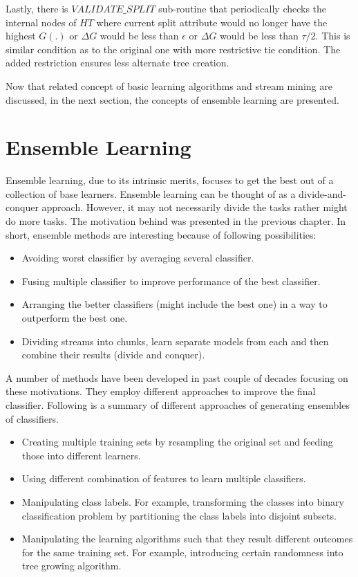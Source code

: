 Lastly, there is $VALIDATE\_SPLIT$ sub-routine that periodically checks the internal nodes of $HT$ where current split attribute would no longer have the highest $G(.)$ or $\Delta G$ would be less than $\epsilon$ or $\Delta G$ would be less than $\tau/2$. This is similar condition as to the original one with more restrictive tie condition. The added restriction ensures less alternate tree creation.

Now that related concept of basic learning algorithms and stream mining are discussed, in the next section, the concepts of ensemble learning are presented.

\section{Ensemble Learning}
Ensemble learning, due to its intrinsic merits, focuses to get the best out of a collection of base learners. Ensemble learning can be thought of as a divide-and-conquer approach. However, it may not necessarily divide the tasks rather might do more tasks. The motivation behind was presented in the previous chapter. In short, ensemble methods are interesting because of following possibilities:
\begin{itemize}
    \item Avoiding worst classifier by averaging several classifier.
    \item Fusing multiple classifier to improve performance of the best classifier.
    \item Arranging the better classifiers (might include the best one) in a way to outperform the best one.
    \item Dividing streams into chunks, learn separate models from each and then combine their results (divide and conquer).
\end{itemize}

A number of methods have been developed in past couple of decades focusing on these motivations. They employ different approaches to improve the final classifier. Following is a summary of different approaches of generating ensembles of classifiers.
\begin{itemize}
    \item Creating multiple training sets by resampling the original set and feeding those into different learners.
    \item Using different combination of features to learn multiple classifiers.
    \item Manipulating class labels. For example, transforming the classes into binary classification problem by partitioning the class labels into disjoint subsets.
    \item Manipulating the learning algorithms such that they result different outcomes for the same training set. For example, introducing certain randomness into tree growing algorithm.
\end{itemize}

